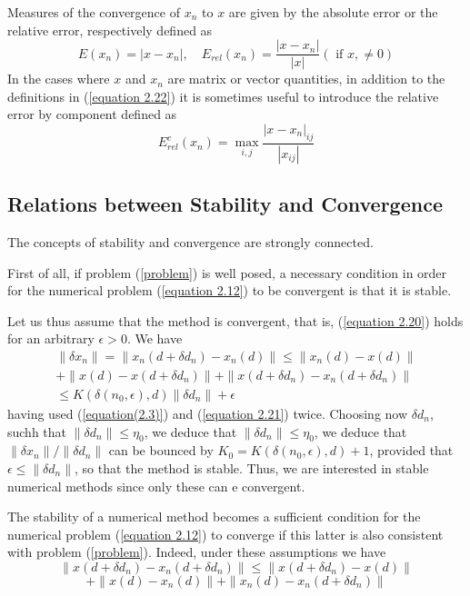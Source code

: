 Measures of the convergence of $x_n$ to $x$ are given by the absolute error or the relative error, respectively defined as
\begin{equation}
    E(x_n) = |x - x_n|, \quad E_{rel}(x_n) = \frac{|x - x_n|}{|x|} (\text{ if } x ,\neq 0)
    \label{equation 2.22}
\end{equation}
In the cases where $x$ and $x_n$ are matrix or vector quantities, in addition to the definitions in (\ref{equation 2.22}) it is sometimes useful to introduce the relative error by component defined as
\begin{equation}
    E_{rel}^c(x_n) = \max_{i,j} \frac{|x - x_n|_{ij}}{|x_{ij}|}
    \label{equation 2.23}
\end{equation}

\subsection{Relations between Stability and Convergence}
The concepts of stability and convergence are strongly connected.

First of all, if problem (\ref{problem}) is well posed, a necessary condition in order for the numerical problem (\ref{equation 2.12}) to be convergent is that it is stable.

Let us thus assume that the method is convergent, that is, (\ref{equation 2.20}) holds for an arbitrary $\epsilon >0 $. We have 
\begin{multline}
    \| \delta x_n \| = \| x_n(d + \delta d_n) - x_n(d) \| \leq \| x_n(d) - x(d) \| \\
    + \| x(d) - x(d + \delta d_n) \| + \| x(d + \delta d_n) - x_n (d + \delta d_n) \| \\
    \leq K(\delta (n_0, \epsilon), d) \| \delta d_n \| + \epsilon
    \label{equation 2.24}
\end{multline}
having used (\ref{equation(2.3)}) and (\ref{equation 2.21}) twice. Choosing now $\delta d_n$, suchh that $\| \delta d_n \| \leq \eta_0$, we deduce that $\| \delta d_n \| \leq \eta_0$, we deduce that $\| \delta x_n \| / \| \delta d_n \|$ can be bounced by $K_0 = K(\delta (n_0 , \epsilon), d) + 1$, provided that $\epsilon \leq \| \delta d_n \|$, so that the method is stable. Thus, we are interested in stable numerical methods since only these can e convergent.

The stability of a numerical method becomes a sufficient condition for the numerical problem (\ref{equation 2.12}) to converge if this latter is also consistent with problem (\ref{problem}). Indeed, under these assumptions we have
\[ \|x(d + \delta d_n) - x_n(d + \delta d_n)\| \leq \| x(d + \delta d_n) - x(d) \| \]
\[ + \| x(d) - x_n(d) \| + \| x_n(d) - x_n(d + \delta d_n)\| \]


